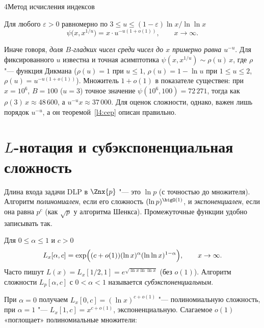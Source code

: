 \begin{lecture}{4}{Метод исчисления индексов}
\begin{theorem}
\label{l4:cep}
Для любого $\varepsilon > 0$ равномерно по $3 \le u \le (1 - \varepsilon) \ln x / \ln\ln x$
\[
  \psi\bigl(x, x^{1/u}\bigr) = x \cdot u^{-u(1 + o(1))}, \qquad x \to \infty.
\]
\end{theorem}

Иначе говоря, \emph{доля $B$-гладких чисел среди чисел до $x$ примерно равна $u^{-u}$}.
Для фиксированного $u$ известна и точная асимптотика $\psi(x, x^{1/u}) \sim \rho(u)\, x$, где
$\rho$ "--- функция Дикмана ($\rho(u) = 1$ при $u \le 1$, $\rho(u) = 1 - \ln u$ при $1 \le u \le
2$, $\rho(u) = u^{-u(1 + o(1))}$). Множитель $1 + o(1)$ в показателе существен: при $x = 10^6$,
$B = 100$ ($u = 3$) точное значение $\psi(10^6, 100) = 72\,271$, тогда как $\rho(3)\, x \approx
48\,600$, а $u^{-u} x \approx 37\,000$. Для оценок сложности, однако, важен лишь порядок
$u^{-u}$, а он теоремой~\ref{l4:cep} описан правильно.


\section{\texorpdfstring{$L$}{L}-нотация и субэкспоненциальная сложность}

Длина входа задачи DLP в $\Znx{p}$ "--- это $\ln p$ (с точностью до множителя). Алгоритм
\emph{полиномиален}, если его сложность $(\ln p)^{\bigO(1)}$, и \emph{экспоненциален}, если она
равна $p^{c}$ (как $\sqrt p$ у алгоритма Шенкса). Промежуточные функции удобно записывать так.

\begin{definition}
Для $0 \le \alpha \le 1$ и $c > 0$
\[
  L_x[\alpha, c] = \exp\Bigl( (c + o(1)) (\ln x)^{\alpha} (\ln\ln x)^{1 - \alpha} \Bigr),
  \qquad x \to \infty.
\]
Часто пишут $L(x) = L_x[1/2, 1] = e^{\sqrt{\ln x \ln\ln x}}$ (без $o(1)$). Алгоритм сложности
$L_p[\alpha, c]$ с $0 < \alpha < 1$ называется \emph{субэкспоненциальным}.
\end{definition}

При $\alpha = 0$ получаем $L_x[0, c] = (\ln x)^{c + o(1)}$ "--- полиномиальную сложность, при
$\alpha = 1$ "--- $L_x[1, c] = x^{c + o(1)}$, экспоненциальную. Слагаемое $o(1)$ «поглощает»
полиномиальные множители:


\end{lecture}
